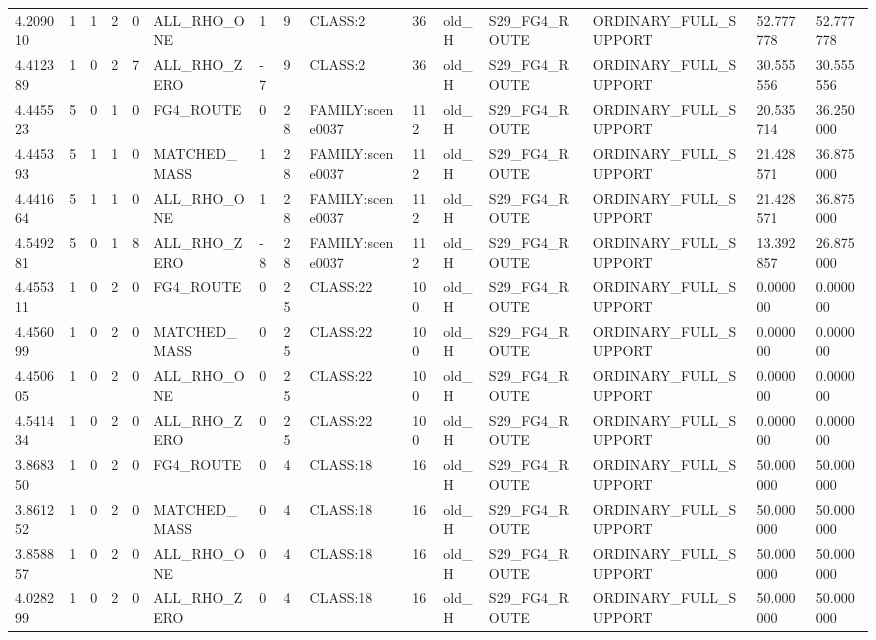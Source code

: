 \begin{tabular}{lllllllllllllll}
4.209010 & 1 & 1 & 2 & 0 & ALL\_RHO\_ONE & 1 & 9 & CLASS:2 & 36 & old\_H & S29\_FG4\_ROUTE & ORDINARY\_FULL\_SUPPORT & 52.777778 & 52.777778 \\
4.412389 & 1 & 0 & 2 & 7 & ALL\_RHO\_ZERO & -7 & 9 & CLASS:2 & 36 & old\_H & S29\_FG4\_ROUTE & ORDINARY\_FULL\_SUPPORT & 30.555556 & 30.555556 \\
4.445523 & 5 & 0 & 1 & 0 & FG4\_ROUTE & 0 & 28 & FAMILY:scene0037 & 112 & old\_H & S29\_FG4\_ROUTE & ORDINARY\_FULL\_SUPPORT & 20.535714 & 36.250000 \\
4.445393 & 5 & 1 & 1 & 0 & MATCHED\_MASS & 1 & 28 & FAMILY:scene0037 & 112 & old\_H & S29\_FG4\_ROUTE & ORDINARY\_FULL\_SUPPORT & 21.428571 & 36.875000 \\
4.441664 & 5 & 1 & 1 & 0 & ALL\_RHO\_ONE & 1 & 28 & FAMILY:scene0037 & 112 & old\_H & S29\_FG4\_ROUTE & ORDINARY\_FULL\_SUPPORT & 21.428571 & 36.875000 \\
4.549281 & 5 & 0 & 1 & 8 & ALL\_RHO\_ZERO & -8 & 28 & FAMILY:scene0037 & 112 & old\_H & S29\_FG4\_ROUTE & ORDINARY\_FULL\_SUPPORT & 13.392857 & 26.875000 \\
4.455311 & 1 & 0 & 2 & 0 & FG4\_ROUTE & 0 & 25 & CLASS:22 & 100 & old\_H & S29\_FG4\_ROUTE & ORDINARY\_FULL\_SUPPORT & 0.000000 & 0.000000 \\
4.456099 & 1 & 0 & 2 & 0 & MATCHED\_MASS & 0 & 25 & CLASS:22 & 100 & old\_H & S29\_FG4\_ROUTE & ORDINARY\_FULL\_SUPPORT & 0.000000 & 0.000000 \\
4.450605 & 1 & 0 & 2 & 0 & ALL\_RHO\_ONE & 0 & 25 & CLASS:22 & 100 & old\_H & S29\_FG4\_ROUTE & ORDINARY\_FULL\_SUPPORT & 0.000000 & 0.000000 \\
4.541434 & 1 & 0 & 2 & 0 & ALL\_RHO\_ZERO & 0 & 25 & CLASS:22 & 100 & old\_H & S29\_FG4\_ROUTE & ORDINARY\_FULL\_SUPPORT & 0.000000 & 0.000000 \\
3.868350 & 1 & 0 & 2 & 0 & FG4\_ROUTE & 0 & 4 & CLASS:18 & 16 & old\_H & S29\_FG4\_ROUTE & ORDINARY\_FULL\_SUPPORT & 50.000000 & 50.000000 \\
3.861252 & 1 & 0 & 2 & 0 & MATCHED\_MASS & 0 & 4 & CLASS:18 & 16 & old\_H & S29\_FG4\_ROUTE & ORDINARY\_FULL\_SUPPORT & 50.000000 & 50.000000 \\
3.858857 & 1 & 0 & 2 & 0 & ALL\_RHO\_ONE & 0 & 4 & CLASS:18 & 16 & old\_H & S29\_FG4\_ROUTE & ORDINARY\_FULL\_SUPPORT & 50.000000 & 50.000000 \\
4.028299 & 1 & 0 & 2 & 0 & ALL\_RHO\_ZERO & 0 & 4 & CLASS:18 & 16 & old\_H & S29\_FG4\_ROUTE & ORDINARY\_FULL\_SUPPORT & 50.000000 & 50.000000 \\

\end{tabular}
